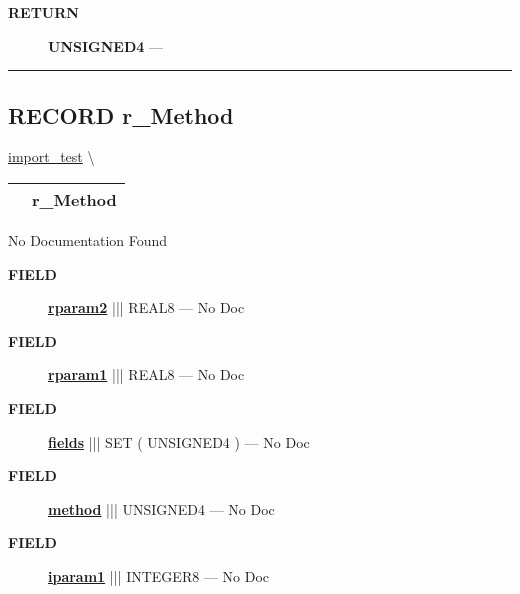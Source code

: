 \par
\begin{description}
\item [\colorbox{tagtype}{\color{white} \textbf{\textsf{RETURN}}}] \textbf{UNSIGNED4} --- 
\end{description}




\rule{\linewidth}{0.5pt}
\subsection*{\textsf{\colorbox{headtoc}{\color{white} RECORD}
r\_Method}}

\hypertarget{ecldoc:ml_core.discretize.r_method}{}
\hspace{0pt} \hyperlink{ecldoc:ML_Core.Discretize}{import_test} \textbackslash 

{\renewcommand{\arraystretch}{1.5}
\begin{tabularx}{\textwidth}{|>{\raggedright\arraybackslash}l|X|}
\hline
\hspace{0pt}\mytexttt{\color{red} } & \textbf{r\_Method} \\
\hline
\end{tabularx}
}

\par





No Documentation Found







\par
\begin{description}
\item [\colorbox{tagtype}{\color{white} \textbf{\textsf{FIELD}}}] \textbf{\underline{rparam2}} ||| REAL8 --- No Doc
\item [\colorbox{tagtype}{\color{white} \textbf{\textsf{FIELD}}}] \textbf{\underline{rparam1}} ||| REAL8 --- No Doc
\item [\colorbox{tagtype}{\color{white} \textbf{\textsf{FIELD}}}] \textbf{\underline{fields}} ||| SET ( UNSIGNED4 ) --- No Doc
\item [\colorbox{tagtype}{\color{white} \textbf{\textsf{FIELD}}}] \textbf{\underline{method}} ||| UNSIGNED4 --- No Doc
\item [\colorbox{tagtype}{\color{white} \textbf{\textsf{FIELD}}}] \textbf{\underline{iparam1}} ||| INTEGER8 --- No Doc
\end{description}





